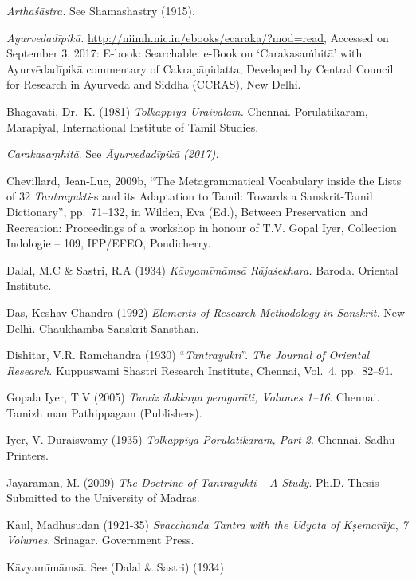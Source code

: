 \begin{thebibliography}{99}
 \textit{Arthaśāstra.} See Shamashastry (1915).

  \textit{Āyurvedadīpikā.} \url{http://niimh.nic.in/ebooks/ecaraka/?mod=read}, Accessed on September 3, 2017: E-book: Searchable: e-Book on ‘Carakasaṁhitā’ with Āyurvēdadīpikā commentary of Cakrapāṇidatta, Developed by Central Council for Research in Ayurveda and Siddha (CCRAS), New Delhi.

  Bhagavati, Dr.\ K. (1981) \textit{Tolkappiya Uraivalam.} Chennai. Porulatikaram, Marapiyal, International Institute of Tamil Studies.

  \textit{Carakasaṃhitā}. See \textit{Āyurvedadīpikā (2017).}

  Chevillard, Jean-Luc, 2009b, “The Metagrammatical Vocabulary inside the Lists of 32 \textit{Tantrayukti}-s and its Adaptation to Tamil: Towards a Sanskrit-Tamil Dictionary”, pp.~71--132, in Wilden, Eva (Ed.), Between Preservation and Recreation: Proceedings of a workshop in honour of T.V. Gopal Iyer, Collection Indologie – 109, IFP/EFEO, Pondicherry.

  Dalal, M.C \& Sastri, R.A (1934) \textit{Kāvyamīmāmsā Rājaśekhara.} Baroda. Oriental Institute.

  Das, Keshav Chandra (1992) \textit{Elements of Research Methodology in Sanskrit.} New Delhi. Chaukhamba Sanskrit Sansthan.

  Dishitar, V.R. Ramchandra (1930) “\textit{Tantrayukti}”. \textit{The Journal of Oriental Research}. Kuppuswami Shastri Research Institute, Chennai, Vol.~4, pp.~82--91.

  Gopala Iyer, T.V (2005) \textit{Tamiz ilakkaṇa peragarāti, Volumes 1--16}. Chennai. Tamizh man Pathippagam (Publishers).

  Iyer, V. Duraiswamy (1935) \textit{Tolkāppiya Porulatikāram, Part 2}. Chennai. Sadhu Printers.

  Jayaraman, M. (2009) \textit{The Doctrine of Tantrayukti} – \textit{A Study}. Ph.D. Thesis Submitted to the University of Madras.

  Kaul, Madhusudan (1921-35) \textit{Svacchanda Tantra with the Udyota of Kṣemarāja}, \textit{7 Volumes}. Srinagar. Government Press.

  Kāvyamīmāmsā. See (Dalal \& Sastri) (1934)


\end{thebibliography}
